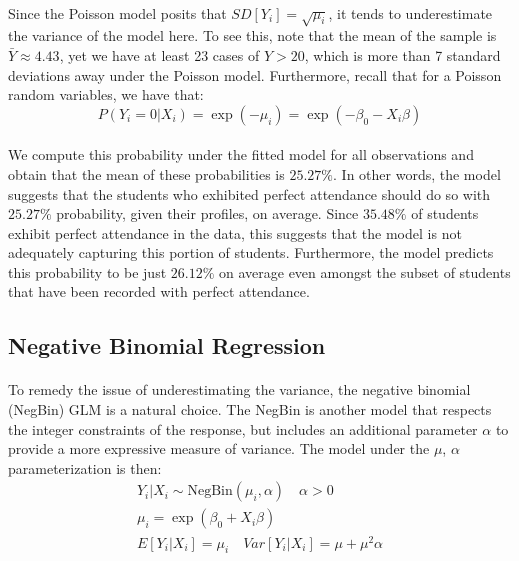 \documentclass[12pt, titlepage]{article}
\begin{document}
	\paragraph{}Since the Poisson model posits that $SD[Y_i] = \sqrt{\mu_i}$, it tends to underestimate the variance of the model here. To see this, note that the mean of the sample is $\bar{Y} \approx 4.43$, yet we have at least 23 cases of $Y > 20$, which is more than 7 standard deviations away under the Poisson model. Furthermore, recall that for a Poisson random variables, we have that:
	$$
	P(Y_i = 0 | X_i) = \exp(-\mu_i) = \exp(-\beta_0 - X_i\beta)
	$$
	\paragraph{} We compute this probability under the fitted model for all observations and obtain that the mean of these probabilities is $25.27\%$. In other words, the model suggests that the students who exhibited perfect attendance should do so with $25.27\%$ probability, given their profiles, on average. Since $35.48\%$ of students exhibit perfect attendance in the data, this suggests that the model is not adequately capturing this portion of students. Furthermore, the model predicts this probability to be just $26.12\%$ on average even amongst the subset of students that have been recorded with perfect attendance.
	
	\subsection{Negative Binomial Regression}
	
	\paragraph{} To remedy the issue of underestimating the variance, the negative binomial (NegBin) GLM is a natural choice. The NegBin is another model that respects the integer constraints of the response, but includes an additional parameter $\alpha$ to provide a more expressive measure of variance. The model under the $\mu$, $\alpha$ parameterization is then:
	\begin{gather*}
	Y_i|X_i \sim \text{NegBin}(\mu_i, \alpha) \quad \alpha > 0\\ 
	\mu_i = \exp(\beta_0 + X_i\beta) \\
	E[Y_i|X_i] = \mu_i \quad Var[Y_i|X_i] = \mu + \mu^2\alpha
	\end{gather*}
\end{document}
